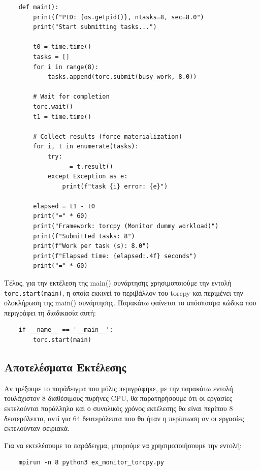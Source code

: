 \begin{verbatim}
    def main():
        print(f"PID: {os.getpid()}, ntasks=8, sec=8.0")
        print("Start submitting tasks...")

        t0 = time.time()
        tasks = []
        for i in range(8):
            tasks.append(torc.submit(busy_work, 8.0))

        # Wait for completion
        torc.wait()
        t1 = time.time()

        # Collect results (force materialization)
        for i, t in enumerate(tasks):
            try:
                _ = t.result()
            except Exception as e:
                print(f"task {i} error: {e}")

        elapsed = t1 - t0
        print("=" * 60)
        print("Framework: torcpy (Monitor dummy workload)")
        print(f"Submitted tasks: 8")
        print(f"Work per task (s): 8.0")
        print(f"Elapsed time: {elapsed:.4f} seconds")
        print("=" * 60)
\end{verbatim}

Τέλος, για την εκτέλεση της main() συνάρτησης χρησιμοποιούμε την εντολή \texttt{torc.st\linebreak art(main)}, η οποία εκκινεί το περιβάλλον του torcpy και περιμένει την ολοκλήρωση της main() συνάρτησης. Παρακάτω φαίνεται το απόσπασμα κώδικα που περιγράφει τη διαδικασία αυτή:

\begin{verbatim}
    if __name__ == '__main__':
        torc.start(main)
\end{verbatim}

\subsection{Αποτελέσματα Εκτέλεσης}

Αν τρέξουμε το παράδειγμα που μόλις περιγράφηκε, με την παρακάτω εντολή τουλάχιστον 8 διαθέσιμους πυρήνες CPU, θα παρατηρήσουμε ότι οι εργασίες εκτελούνται παράλληλα και ο συνολικός χρόνος εκτέλεσης θα είναι περίπου 8 δευτερόλεπτα, αντί για 64 δευτερόλεπτα που θα ήταν η περίπτωση αν οι εργασίες εκτελούνταν σειριακά.

Για να εκτελέσουμε το παράδειγμα, μπορούμε να χρησιμοποιήσουμε την εντολή:

\begin{verbatim}
    mpirun -n 8 python3 ex_monitor_torcpy.py
\end{verbatim}

